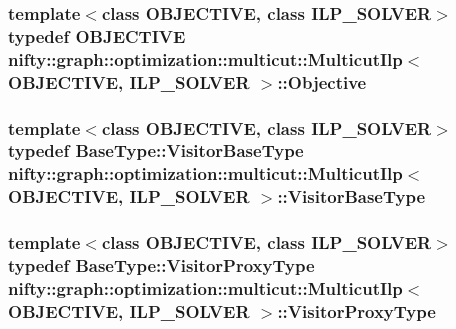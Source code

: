 \subsubsection[{Objective}]{\setlength{\rightskip}{0pt plus 5cm}template$<$class O\+B\+J\+E\+C\+T\+I\+V\+E, class I\+L\+P\+\_\+\+S\+O\+L\+V\+E\+R$>$ typedef O\+B\+J\+E\+C\+T\+I\+V\+E {\bf nifty\+::graph\+::optimization\+::multicut\+::\+Multicut\+Ilp}$<$ O\+B\+J\+E\+C\+T\+I\+V\+E, I\+L\+P\+\_\+\+S\+O\+L\+V\+E\+R $>$\+::{\bf Objective}}\label{classnifty_1_1graph_1_1optimization_1_1multicut_1_1MulticutIlp_a1c9fe5899608fc9c8e32bde6648c8278}
\hypertarget{classnifty_1_1graph_1_1optimization_1_1multicut_1_1MulticutIlp_a9eefe7c387f863ed499bb53854164d9a}{}
\subsubsection[{Visitor\+Base\+Type}]{\setlength{\rightskip}{0pt plus 5cm}template$<$class O\+B\+J\+E\+C\+T\+I\+V\+E, class I\+L\+P\+\_\+\+S\+O\+L\+V\+E\+R$>$ typedef {\bf Base\+Type\+::\+Visitor\+Base\+Type} {\bf nifty\+::graph\+::optimization\+::multicut\+::\+Multicut\+Ilp}$<$ O\+B\+J\+E\+C\+T\+I\+V\+E, I\+L\+P\+\_\+\+S\+O\+L\+V\+E\+R $>$\+::{\bf Visitor\+Base\+Type}}\label{classnifty_1_1graph_1_1optimization_1_1multicut_1_1MulticutIlp_a9eefe7c387f863ed499bb53854164d9a}
\hypertarget{classnifty_1_1graph_1_1optimization_1_1multicut_1_1MulticutIlp_ad770feadea053ce14d19fb0db774867b}{}
\subsubsection[{Visitor\+Proxy\+Type}]{\setlength{\rightskip}{0pt plus 5cm}template$<$class O\+B\+J\+E\+C\+T\+I\+V\+E, class I\+L\+P\+\_\+\+S\+O\+L\+V\+E\+R$>$ typedef {\bf Base\+Type\+::\+Visitor\+Proxy\+Type} {\bf nifty\+::graph\+::optimization\+::multicut\+::\+Multicut\+Ilp}$<$ O\+B\+J\+E\+C\+T\+I\+V\+E, I\+L\+P\+\_\+\+S\+O\+L\+V\+E\+R $>$\+::{\bf Visitor\+Proxy\+Type}}\label{classnifty_1_1graph_1_1optimization_1_1multicut_1_1MulticutIlp_ad770feadea053ce14d19fb0db774867b}


